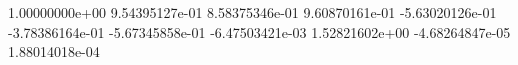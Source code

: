  1.00000000e+00
 9.54395127e-01
 8.58375346e-01
 9.60870161e-01
 -5.63020126e-01
 -3.78386164e-01
 -5.67345858e-01
 -6.47503421e-03
 1.52821602e+00
 -4.68264847e-05
 1.88014018e-04
